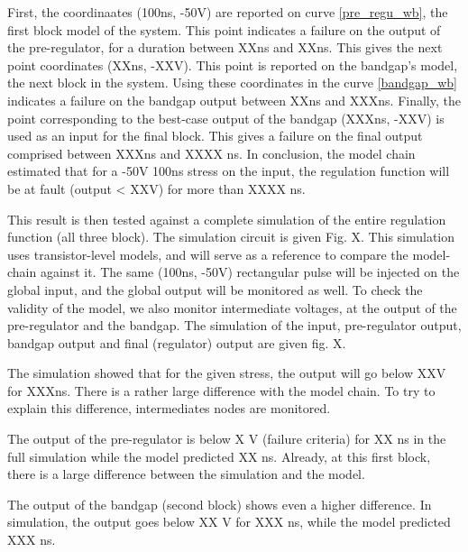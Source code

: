First, the coordinaates (100ns, -50V) are reported on curve \ref{pre_regu_wb}, the first block model of the system.
This point indicates a failure on the output of the pre-regulator, for a duration between XXns and XXns.
This gives the next point coordinates (XXns, -XXV).
This point is reported on the bandgap's model, the next block in the system.
Using these coordinates in the curve \ref{bandgap_wb} indicates a failure on the bandgap output between XXns and XXXns.
Finally, the point corresponding to the best-case output of the bandgap (XXXns, -XXV) is used as an input for the final block.
This gives a failure on the final output comprised between XXXns and XXXX ns.
In conclusion, the model chain estimated that for a -50V 100ns stress on the input, the regulation function will be at fault (output < XXV) for more than XXXX ns.


This result is then tested against a complete simulation of the entire regulation function (all three block).
The simulation circuit is given Fig. X.
This simulation uses transistor-level models, and will serve as a reference to compare the model-chain against it.
The same (100ns, -50V) rectangular pulse will be injected on the global input, and the global output will be monitored as well.
To check the validity of the model, we also monitor intermediate voltages, at the output of the pre-regulator and the bandgap.
The simulation of the input, pre-regulator output, bandgap output and final (regulator) output are given fig. X.



The simulation showed that for the given stress, the output will go below XXV for XXXns.
There is a rather large difference with the model chain.
To try to explain this difference, intermediates nodes are monitored.

The output of the pre-regulator is below X V (failure criteria) for XX ns in the full simulation while the model predicted XX ns.
Already, at this first block, there is a large difference between the simulation and the model.

The output of the bandgap (second block) shows even a higher difference.
In simulation, the output goes below XX V for XXX ns, while the model predicted XXX ns.

